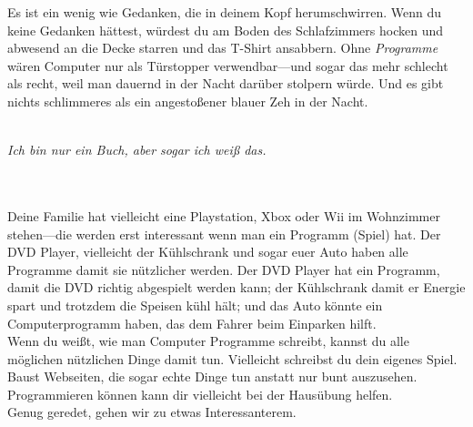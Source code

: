 Es ist ein wenig wie Gedanken, die in deinem Kopf herumschwirren. Wenn du keine Gedanken hättest, würdest du am Boden des Schlafzimmers hocken und abwesend an die Decke starren und das T-Shirt ansabbern. Ohne \emph{Programme} wären Computer nur als Türstopper verwendbar---und sogar das mehr schlecht als recht, weil man dauernd in der Nacht darüber stolpern würde. Und es gibt nichts schlimmeres als ein angestoßener blauer Zeh in der Nacht.
\\
\\
\begin{samepage}\emph{Ich bin nur ein Buch, aber sogar ich weiß das.}\end{samepage}
\\
\\
Deine Familie hat vielleicht eine Playstation, Xbox oder Wii im Wohnzimmer stehen---die werden erst interessant wenn man ein Programm (Spiel) hat. Der DVD Player, vielleicht der Kühlschrank und sogar euer Auto haben alle Programme damit sie nützlicher werden. Der DVD Player hat ein Programm, damit die DVD richtig abgespielt werden kann; der Kühlschrank damit er Energie spart und trotzdem die Speisen kühl hält; und das Auto könnte ein Computerprogramm haben, das dem Fahrer beim Einparken hilft.\\
Wenn du weißt, wie man Computer Programme schreibt, kannst du alle möglichen nützlichen Dinge damit tun. Vielleicht schreibst du dein eigenes Spiel. Baust Webseiten, die sogar echte Dinge tun anstatt nur bunt auszusehen. Programmieren können kann dir vielleicht bei der Hausübung helfen.
\\
Genug geredet, gehen wir zu etwas Interessanterem.

